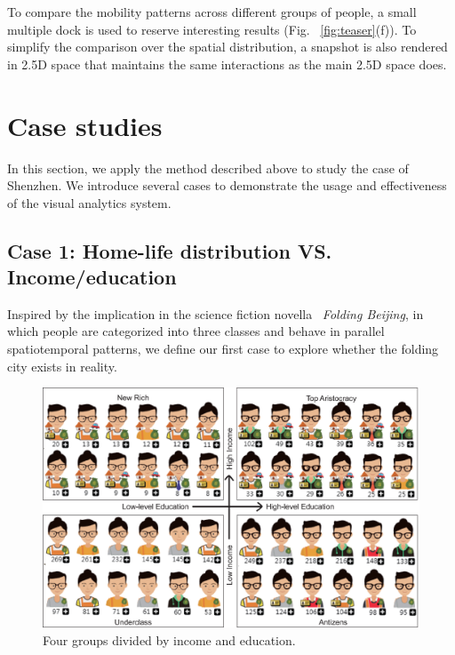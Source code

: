 \documentclass{ieeeaccess}
\begin{document}
To compare the mobility patterns across different groups of people, a small multiple dock is used to reserve interesting results (Fig. ~\ref{fig:teaser}(f)). To simplify the comparison over the spatial distribution, a snapshot is also rendered in 2.5D space that maintains the same interactions as the main 2.5D space does.


\section{Case studies}

In this section, we apply the method described above to study the case of Shenzhen. We introduce several cases to demonstrate the usage and effectiveness of the visual analytics system.

\subsection{Case 1: Home-life distribution VS. Income/education}

Inspired by the implication in the science fiction novella ~\textit{Folding Beijing}, in which people are categorized into three classes and behave in parallel spatiotemporal patterns, we define our first case to explore whether the folding city exists in reality.

\begin{figure}[htb!]
 \centering
 \includegraphics[width=\columnwidth]{pictures/case1_1}
 \caption{Four groups divided by income and education.}
 \label{case11}
\end{figure}
\end{document}
